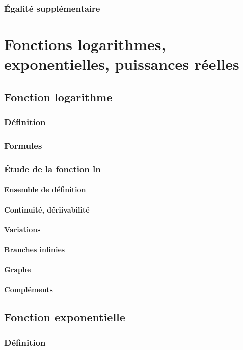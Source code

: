 \documentclass[12pt,a4paper,french]{book}
\begin{document}
		\subsection{Égalité supplémentaire}

\chapter{Fonctions logarithmes, exponentielles, puissances réelles}
	\section{Fonction logarithme}
		\subsection{Définition}
		\subsection{Formules}
		\subsection{Étude de la fonction ln}
			\subsubsection{Ensemble de définition}
			\subsubsection{Continuité, dériivabilité}
			\subsubsection{Variations}
			\subsubsection{Branches infinies}
			\subsubsection{Graphe}
			\subsubsection{Compléments}
	\section{Fonction exponentielle}
		\subsection{Définition}
\end{document}
